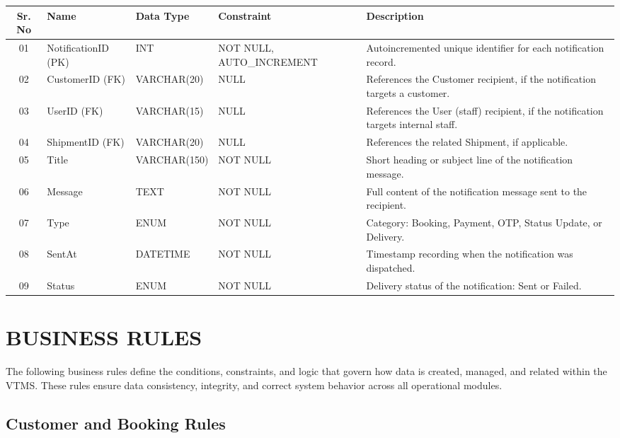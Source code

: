 \documentclass[12pt,a4paper]{report}
\begin{document}
\begin{longtable}{|c|p{3.8cm}|p{2.5cm}|p{3.5cm}|p{5.5cm}|}
\hline
\textbf{Sr. No} & \textbf{Name} & \textbf{Data Type} & \textbf{Constraint} & \textbf{Description} \\
\hline
01 & NotificationID (PK) & INT & NOT NULL, AUTO\_INCREMENT & Auto\-incremented unique identifier for each notification record. \\
\hline
02 & CustomerID (FK) & VARCHAR(20) & NULL & References the Customer recipient, if the notification targets a customer. \\
\hline
03 & UserID (FK) & VARCHAR(15) & NULL & References the User (staff) recipient, if the notification targets internal staff. \\
\hline
04 & ShipmentID (FK) & VARCHAR(20) & NULL & References the related Shipment, if applicable. \\
\hline
05 & Title & VARCHAR(150) & NOT NULL & Short heading or subject line of the notification message. \\
\hline
06 & Message & TEXT & NOT NULL & Full content of the notification message sent to the recipient. \\
\hline
07 & Type & ENUM & NOT NULL & Category: Booking, Payment, OTP, Status Update, or Delivery. \\
\hline
08 & SentAt & DATETIME & NOT NULL & Timestamp recording when the notification was dispatched. \\
\hline
09 & Status & ENUM & NOT NULL & Delivery status of the notification: Sent or Failed. \\
\hline
\end{longtable}
\section{BUSINESS RULES}

The following business rules define the conditions, constraints, and logic that govern how data is created, managed, and related within the VTMS. These rules ensure data consistency, integrity, and correct system behavior across all operational modules.

\subsection{Customer and Booking Rules}
\end{document}
